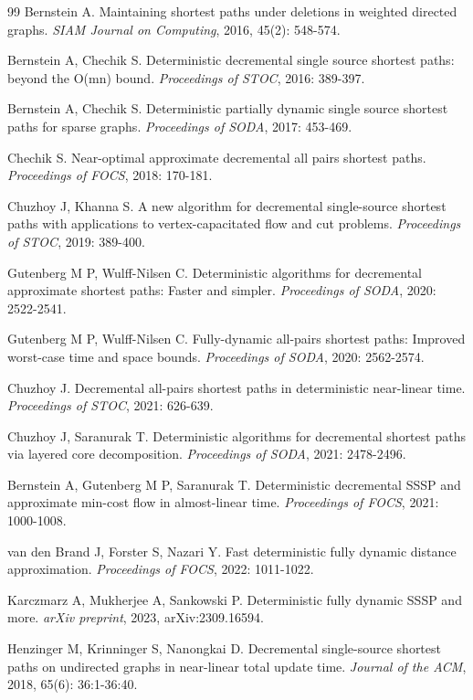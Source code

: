 \documentclass[12pt,a4paper]{ctexart}
\begin{document}
\begin{thebibliography}{99}
 Bernstein A. Maintaining shortest paths under deletions in weighted directed graphs. \textit{SIAM Journal on Computing}, 2016, 45(2): 548-574.

 Bernstein A, Chechik S. Deterministic decremental single source shortest paths: beyond the O(mn) bound. \textit{Proceedings of STOC}, 2016: 389-397.

 Bernstein A, Chechik S. Deterministic partially dynamic single source shortest paths for sparse graphs. \textit{Proceedings of SODA}, 2017: 453-469.

 Chechik S. Near-optimal approximate decremental all pairs shortest paths. \textit{Proceedings of FOCS}, 2018: 170-181.

 Chuzhoy J, Khanna S. A new algorithm for decremental single-source shortest paths with applications to vertex-capacitated flow and cut problems. \textit{Proceedings of STOC}, 2019: 389-400.

 Gutenberg M P, Wulff-Nilsen C. Deterministic algorithms for decremental approximate shortest paths: Faster and simpler. \textit{Proceedings of SODA}, 2020: 2522-2541.

 Gutenberg M P, Wulff-Nilsen C. Fully-dynamic all-pairs shortest paths: Improved worst-case time and space bounds. \textit{Proceedings of SODA}, 2020: 2562-2574.

 Chuzhoy J. Decremental all-pairs shortest paths in deterministic near-linear time. \textit{Proceedings of STOC}, 2021: 626-639.

 Chuzhoy J, Saranurak T. Deterministic algorithms for decremental shortest paths via layered core decomposition. \textit{Proceedings of SODA}, 2021: 2478-2496.

 Bernstein A, Gutenberg M P, Saranurak T. Deterministic decremental SSSP and approximate min-cost flow in almost-linear time. \textit{Proceedings of FOCS}, 2021: 1000-1008.

 van den Brand J, Forster S, Nazari Y. Fast deterministic fully dynamic distance approximation. \textit{Proceedings of FOCS}, 2022: 1011-1022.

 Karczmarz A, Mukherjee A, Sankowski P. Deterministic fully dynamic SSSP and more. \textit{arXiv preprint}, 2023, arXiv:2309.16594.

 Henzinger M, Krinninger S, Nanongkai D. Decremental single-source shortest paths on undirected graphs in near-linear total update time. \textit{Journal of the ACM}, 2018, 65(6): 36:1-36:40.


\end{thebibliography}
\end{document}
